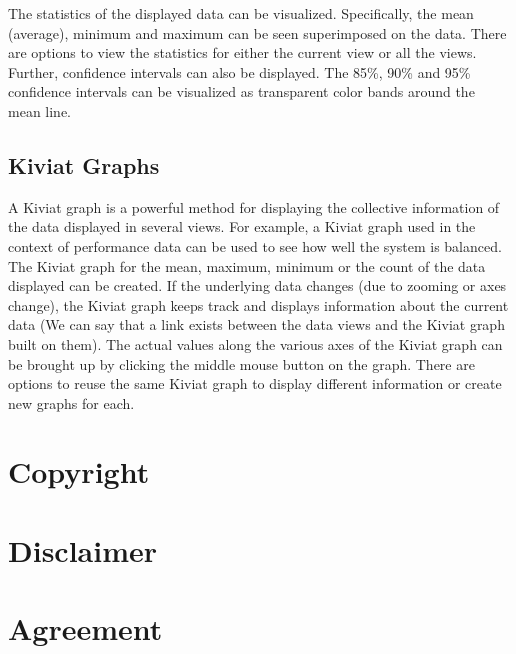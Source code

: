 The statistics of the displayed data can be visualized. Specifically,
the mean (average), minimum and maximum can be seen superimposed on
the data.  There are options to view the statistics for either the
current view or all the views.  Further, confidence intervals can also
be displayed.  The 85\%, 90\% and 95\% confidence intervals can be
visualized as transparent color bands around the mean line.

\subsection{Kiviat Graphs}

A Kiviat graph is a powerful method for displaying the collective
information of the data displayed in several views. For example, a
Kiviat graph used in the context of performance data can be used to
see how well the system is balanced. The Kiviat graph for the mean,
maximum, minimum or the count of the data displayed can be created. If
the underlying data changes (due to zooming or axes change), the
Kiviat graph keeps track and displays information about the current
data (We can say that a link exists between the data views and the
Kiviat graph built on them). The actual values along the various axes
of the Kiviat graph can be brought up by clicking the middle mouse
button on the graph. There are options to reuse the same Kiviat graph
to display different information or create new graphs for each.

\newpage
\section{Copyright}



\section{Disclaimer}



\newpage
\section{Agreement}




